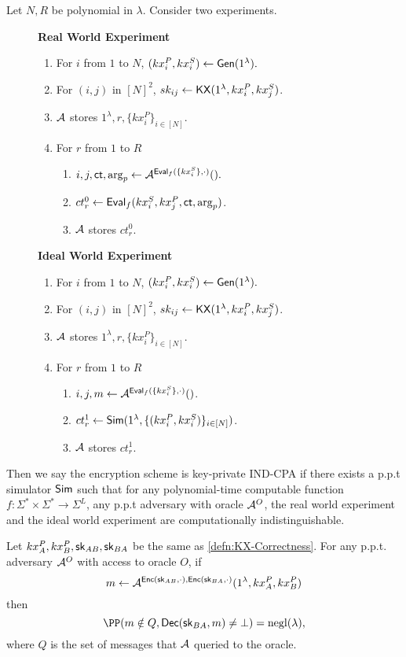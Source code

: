 \begin{definition}
\label{defn:sym-security}
Let $N, R$ be polynomial in $\lambda$. Consider two experiments.
\begin{figure}[h!]
\begin{framed}
\textbf{Real World Experiment}
\begin{enumerate}
    \item For $i$ from $1$ to $N$, $(kx_i^P, kx_i^S) \leftarrow \mathsf{Gen}(1^{\lambda}).$
    \item For $(i, j)$ in $[N]^2$, $sk_{ij} \leftarrow \mathsf{KX}(1^{\lambda}, kx_i^P, kx_j^S)$.
    \item $\mathcal{A}$ stores $1^{\lambda}, r, \{kx_i^P\}_{i \in [N]}$.
    \item For $r$ from $1$ to $R$
    \begin{enumerate}
        \item $i, j, \mathsf{ct}, \arg_p \leftarrow \mathcal{A}^{\mathsf{Eval}_f(\{kx_i^S\}, \cdot)}().$
        \item $ct^{0}_r \leftarrow \mathsf{Eval}_f(kx_i^S, kx_j^P, \mathsf{ct}, \arg_p)$.
        \item $\mathcal{A}$ stores $ct^{0}_r$.
    \end{enumerate}
\end{enumerate}
\textbf{Ideal World Experiment}
\begin{enumerate}
    \item For $i$ from $1$ to $N$, $(kx_i^P, kx_i^S) \leftarrow \mathsf{Gen}(1^{\lambda}).$
    \item For $(i, j)$ in $[N]^2$, $sk_{ij} \leftarrow \mathsf{KX}(1^{\lambda}, kx_i^P, kx_j^S)$.
    \item $\mathcal{A}$ stores $1^{\lambda}, r, \{kx_i^P\}_{i \in [N]}$.
    \item For $r$ from $1$ to $R$
    \begin{enumerate}
        \item $i, j, m \leftarrow \mathcal{A}^{\mathsf{Eval}_f(\{kx_i^S\}, \cdot)}()$.
        \item $ct^1_r \leftarrow \mathsf{Sim}(1^{\lambda}, \{(kx_i^P, kx_i^S)\}_{i \in [N]})$.
        \item $\mathcal{A}$ stores $ct^{1}_r$.
    \end{enumerate}
\end{enumerate}
\end{framed}
\end{figure}

Then we say the encryption scheme is key-private IND-CPA if there exists a p.p.t simulator $\mathsf{Sim}$ such that for any polynomial-time computable function $f: \Sigma^* \times \Sigma^* \to \Sigma^{L}$, any p.p.t adversary with oracle $\mathcal{A}^O$, the real world experiment and the ideal world experiment are computationally indistinguishable.
\end{definition}
\begin{definition}
Let $kx^P_A, kx^P_B, {\mathsf{sk}}_{AB}, {\mathsf{sk}}_{BA}$ be the same as \cref{defn:KX-Correctness}. For any p.p.t. adversary $\mathcal{A}^O$ with access to oracle $O$, if
$$m \leftarrow \mathcal{A}^{\mathsf{Enc}({\mathsf{sk}}_{AB}, \cdot), \mathsf{Enc}({\mathsf{sk}}_{BA}, \cdot)}(1^{\lambda}, kx^P_A, kx^P_B)$$
then 
$$\PP(m \notin Q, \Dec(\sk_{BA}, m) \neq \bot) = \negl(\lambda),$$
where $Q$ is the set of messages that $\mathcal{A}$ queried to the oracle.
\end{definition}

